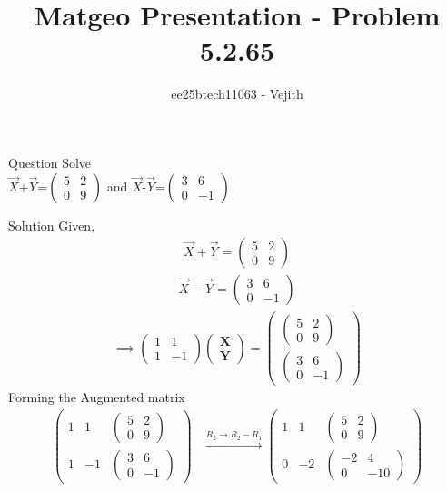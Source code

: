 \documentclass{beamer}
\title{Matgeo Presentation - Problem 5.2.65}
\author{ee25btech11063 - Vejith}
\numberwithin{equation}{section}
\theoremstyle{remark}
\newcommand{\myvec}[1]{\ensuremath{\begin{pmatrix}#1\end{pmatrix}}}
\let\vec\mathbf
\begin{document}
\frame{\titlepage}
\begin{frame}{Question}
Solve\\
$\Vec{X}$+$\Vec{Y}$=$\begin{pmatrix}
    5 & 2\\
    0 & 9
\end{pmatrix}$ and $\Vec{X}$-$\Vec{Y}$=$\begin{pmatrix}
    3 & 6\\
    0 & -1
\end{pmatrix}$
\end{frame}

\begin{frame}{Solution}
Given,
\begin{align}
    \Vec{X}+\Vec{Y}=\begin{pmatrix}
    5 & 2\\
    0 & 9
    \end{pmatrix}
\end{align}
\begin{align}
    \Vec{X}-\Vec{Y}=\begin{pmatrix}
    3 & 6\\
    0 & -1
\end{pmatrix}
\end{align}
\begin{align}
    \implies \begin{pmatrix}
        1 & 1\\
         1 & -1
    \end{pmatrix} \myvec{\vec{X}\\\vec{Y}}=\myvec{\begin{pmatrix} 5 & 2 \\ 0 & 9 \end{pmatrix}\\\begin{pmatrix} 3 & 6 \\ 0 & -1 \end{pmatrix}}
    \end{align}
Forming the Augmented matrix
\begin{align}
\left(\begin{array}{cc|c}
1 & 1 & \begin{pmatrix} 5 & 2 \\ 0 & 9 \end{pmatrix} \\
1 & -1 & \begin{pmatrix} 3 & 6 \\ 0 & -1 \end{pmatrix}
\end{array}\right)  &\xrightarrow{R_2 \rightarrow R_2-R_1} \left(\begin{array}{cc|c}
1 & 1 & \begin{pmatrix} 5 & 2 \\ 0 & 9 \end{pmatrix} \\
0 & -2 & \begin{pmatrix} -2 & 4 \\ 0 & -10 \end{pmatrix}
\end{array}\right)
\end{align}
\end{frame}
\end{document}

